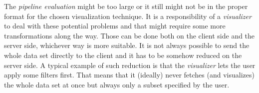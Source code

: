 The \emph{pipeline evaluation} might be too large or it still might not be in the proper format for the chosen visualization technique. It is a responsibility of a \emph{visualizer} to deal with these potential problems and that might require some more transformations along the way. Those can be done both on the client side and the server side, whichever way is more suitable. It is not always possible to send the whole data set directly to the client and it has to be somehow reduced on the server side. A typical example of such reduction is that the \emph{visualizer} lets the user apply some filters first. That means that it (ideally) never fetches (and visualizes) the whole data set at once but always only a subset specified by the user. 